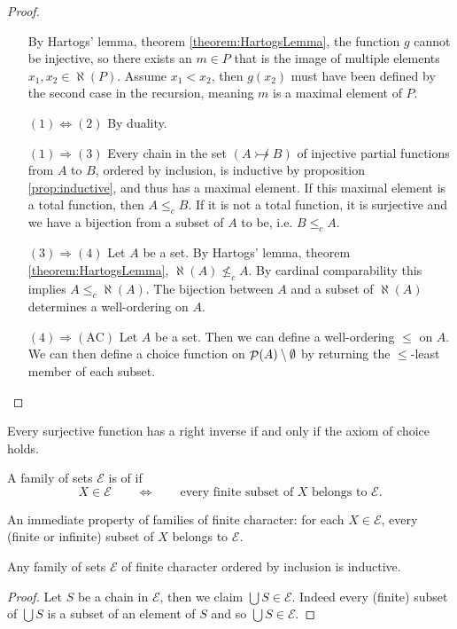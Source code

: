 \begin{proof}
\begin{itemize}[leftmargin=2cm]
By Hartogs' lemma, theorem \ref{theorem:HartogsLemma}, the function $g$ cannot be injective, so there exists an $m\in P$ that is the image of multiple elements $x_1,x_2\in\aleph(P)$. Assume $x_1 < x_2$, then $g(x_2)$ must have been defined by the second case in the recursion, meaning $m$ is a maximal element of $P$.
\item[$\boxed{(1) \Leftrightarrow (2)}$] By duality.
\item[$\boxed{(1) \Rightarrow (3)}$] Every chain in the set $(A \not\rightarrowtail B)$ of injective partial functions from $A$ to $B$, ordered by inclusion, is inductive by proposition \ref{prop:inductive}, and thus has a maximal element. If this maximal element is a total function, then $A\leq_c B$. If it is not a total function, it is surjective and we have a bijection from a subset of $A$ to be, i.e. $B\leq_c A$.
\item[$\boxed{(3) \Rightarrow (4)}$] Let $A$ be a set. By Hartogs' lemma, theorem \ref{theorem:HartogsLemma}, $\aleph(A) \nleq_c A$. By cardinal comparability this implies $A \leq_c \aleph(A)$. The bijection between $A$ and a subset of $\aleph(A)$ determines a well-ordering on $A$.
\item[$\boxed{(4) \Rightarrow (\text{AC})}$] Let $A$ be a set. Then we can define a well-ordering $\leq$ on $A$. We can then define a choice function on $\mathop{\mathcal{P}}(A)\setminus \emptyset$ by returning the $\leq$-least member of each subset.
\end{itemize}
\end{proof}

\begin{lemma} \label{lemma:surjectiveInverse}
Every surjective function has a right inverse \textup{if and only if} the axiom of choice holds.
\end{lemma}

\begin{definition}
A family of sets $\mathcal{E}$ is of  if
\[ X\in \mathcal{E} \qquad \iff \qquad \text{every finite subset of $X$ belongs to $\mathcal{E}$.} \]
\end{definition}
An immediate property of families of finite character: for each $X\in \mathcal{E}$, every (finite or infinite) subset of $X$ belongs to $\mathcal{E}$.

\begin{lemma} \label{lemma:finiteCharacterInductive}
Any family of sets $\mathcal{E}$ of finite character ordered by inclusion is inductive.
\end{lemma}
\begin{proof}
Let $S$ be a chain in $\mathcal{E}$, then we claim $\bigcup S \in \mathcal{E}$. Indeed every (finite) subset of $\bigcup S$ is a subset of an element of $S$ and so $\bigcup S\in \mathcal{E}$.
\end{proof}

